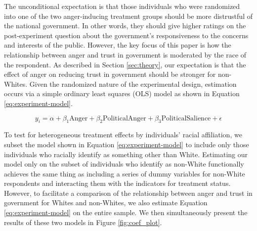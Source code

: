 \documentclass[12pt, letterpaper]{article}
\begin{document}
The unconditional expectation is that those individuals who were randomized into one of the two anger-inducing treatment groups should be more distrustful of the national government. In other words, they should give higher ratings on the post-experiment question about the government's responsiveness to the concerns and interests of the public. However, the key focus of this paper is how the relationship between anger and trust in government is moderated by the race of the respondent. As described in Section \ref{sec:theory}, our expectation is that the effect of anger on reducing trust in government should be stronger for non-Whites. Given the randomized nature of the experimental design, estimation occurs via a simple ordinary least squares (OLS) model as shown in Equation \ref{eq:experiment-model}.

\vspace{-13mm}
\begin{center}
\begin{equation}
y_i = \alpha + \beta_1\textrm{Anger} + \beta_2\textrm{PoliticalAnger} + \beta_3\textrm{PoliticalSalience} + \epsilon
\label{eq:experiment-model}
\end{equation}
\end{center}

To test for heterogeneous treatment effects by individuals' racial affiliation, we subset the model shown in Equation \ref{eq:experiment-model} to include only those individuals who racially identify as something other than White. Estimating our model only on the subset of individuals who identify as non-White functionally achieves the same thing as including a series of dummy variables for non-White respondents and interacting them with the indicators for treatment status. However, to facilitate a comparison of the relationship between anger and trust in government for Whites and non-Whites, we also estimate Equation \ref{eq:experiment-model} on the entire sample. We then simultaneously present the results of these two models in Figure \ref{fig:coef_plot}.

\newpage
\begin{singlespacing}


\end{singlespacing}
\end{document}

